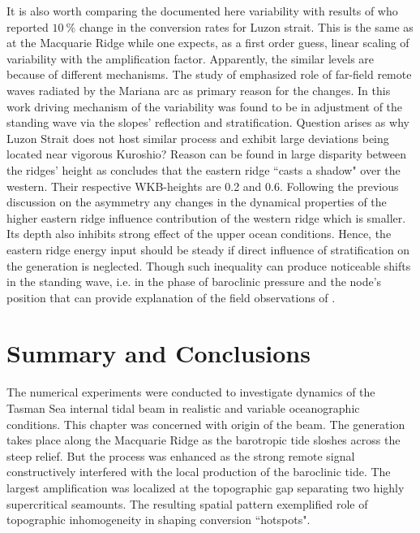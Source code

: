 \documentclass[12pt]{article}
\begin{document}
It is also worth comparing the documented here variability with results of \cite{kerry2014impact} 
who reported $10~\%$ change in the conversion rates for Luzon strait. This is the same as at the 
Macquarie Ridge while one 
expects, as a first order guess, linear scaling of variability with the amplification factor. 
Apparently, the similar levels are because of different mechanisms. The study of 
\cite{kerry2014impact} 
emphasized role of far-field remote waves radiated by the Mariana arc as primary reason for the 
changes. In this work driving mechanism of the variability was found to be in 
adjustment of the standing wave via the slopes' reflection and stratification. Question arises as 
why Luzon Strait 
does not host similar process and exhibit large deviations being located near vigorous Kuroshio? 
Reason can be 
found in large 
disparity 
between the ridges' height as \cite{klymak2013parameterizing} concludes that the eastern ridge ``casts 
a shadow" over the western. Their respective WKB-heights are 0.2 and 0.6. Following the previous 
discussion on the asymmetry any changes in the dynamical properties of the higher eastern ridge 
influence contribution of the western ridge which is smaller. Its depth also 
inhibits strong effect of the upper ocean conditions. Hence, the eastern 
ridge energy input should be steady if direct influence of stratification on the generation is 
neglected. Though such inequality can produce noticeable shifts in the standing wave, i.e. in the phase of baroclinic pressure and the node's position that can provide explanation of the field observations of \cite{buijsman2014three}.

\section{Summary and Conclusions}
The numerical experiments were conducted to investigate dynamics of the Tasman Sea internal tidal 
beam in realistic and variable oceanographic conditions. This chapter was concerned with origin of 
the beam. The generation takes place along the Macquarie Ridge as the barotropic tide sloshes across 
the steep relief. But the process was enhanced as the strong remote signal constructively interfered with the local production of the baroclinic tide. The largest amplification was localized at the topographic gap separating two highly supercritical 
seamounts. The resulting spatial pattern exemplified role of topographic inhomogeneity in shaping 
conversion ``hotspots".\\
\end{document}
